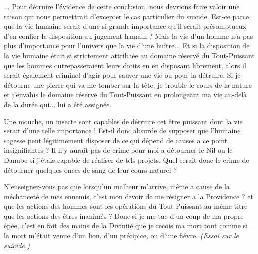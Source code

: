 ... Pour détruire l'évidence de cette conclusion, nous
devrions faire valoir une raison qui nous permettrait
d'excepter le cas particulier du suicide. Est-ce parce que
la vie humaine serait d'une si grande importance qu'il
serait présomptueux d'en confier la disposition au jugement
humain ? Mais la vie d'un homme n'a pas plus
d’importance pour l’univers que la vie d’une huître... Et
si la disposition de la vie humaine était si strictement
attribuée au domaine réservé du Tout-Puissant que les
hommes outrepasseraient leurs droits en en disposant
librement, alors il serait également criminel d’agir pour
sauver une vie ou pour la détruire. Si je détourne une
pierre qui va me tomber sur la tête, je trouble le cours de
la nature et j’envahis le domaine réservé du Tout-Puissant
en prolongeant ma vie au-delà de la durée qui... lui a été
assignée.

Une mouche, un insecte sont capables de détruire cet
être puissant dont la vie serait d’une telle importance !
Est-il donc absurde de supposer que l’humaine sagesse
peut légitimement disposer de ce qui dépend de causes
a ce point insignifiantes ? Il n’y aurait pas de crime pour
moi a détourner le Nil ou le Danube si j’étais capable de
réaliser de tels projets. Quel serait donc le crime de détourner
quelques onces de sang de leur cours naturel ?

N’enseignez-vous pas que lorsqu’un malheur m’arrive,
même a cause de la méchanceté de mes ennemis, c’est
mon devoir de me résigner a la Providence ? et que les
actions des hommes sont les opérations du Tout-Puissant
au même titre que les actions des êtres inanimés ? Donc
si je me tue d’un coup de ma propre épée, c’est en fait des
mains de la Divinité que je recois ma mort tout comme si
la mort m’était venue d’un lion, d’un précipice, ou d’une
fiévre. {\it (Essai sur le suicide.)} 

